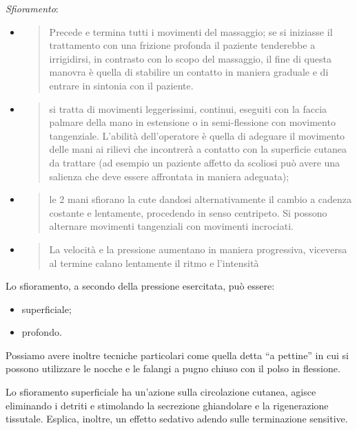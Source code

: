 \documentclass[]{article}
\begin{document}
\emph{\emph{Sfioramento}}:

\begin{itemize}
\item
  \begin{quote}
  Precede e termina tutti i movimenti del massaggio; se si iniziasse il
  trattamento con una frizione profonda il paziente tenderebbe a
  irrigidirsi, in contrasto con lo scopo del massaggio, il fine di
  questa manovra è quella di stabilire un contatto in maniera graduale e
  di entrare in sintonia con il paziente.
  \end{quote}
\item
  \begin{quote}
  si tratta di movimenti leggerissimi, continui, eseguiti con la faccia
  palmare della mano in estensione o in semi-flessione con movimento
  tangenziale. L'abilità dell'operatore è quella di adeguare il
  movimento delle mani ai rilievi che incontrerà a contatto con la
  superficie cutanea da trattare (ad esempio un paziente affetto da
  scoliosi può avere una salienza che deve essere affrontata in maniera
  adeguata);
  \end{quote}
\item
  \begin{quote}
  le 2 mani sfiorano la cute dandosi alternativamente il cambio a
  cadenza costante e lentamente, procedendo in senso centripeto. Si
  possono alternare movimenti tangenziali con movimenti incrociati.
  \end{quote}
\item
  \begin{quote}
  La velocità e la pressione aumentano in maniera progressiva, viceversa
  al termine calano lentamente il ritmo e l'intensità
  \end{quote}
\end{itemize}

Lo sfioramento, a secondo della pressione esercitata, può essere:

\begin{itemize}
\item
  superficiale;
\item
  profondo.
\end{itemize}

Possiamo avere inoltre tecniche particolari come quella detta ``a
pettine'' in cui si possono utilizzare le nocche e le falangi a pugno
chiuso con il polso in flessione.

Lo sfioramento superficiale ha un'azione sulla circolazione cutanea,
agisce eliminando i detriti e stimolando la secrezione ghiandolare e la
rigenerazione tissutale. Esplica, inoltre, un effetto sedativo adendo
sulle terminazione sensitive.
\end{document}
